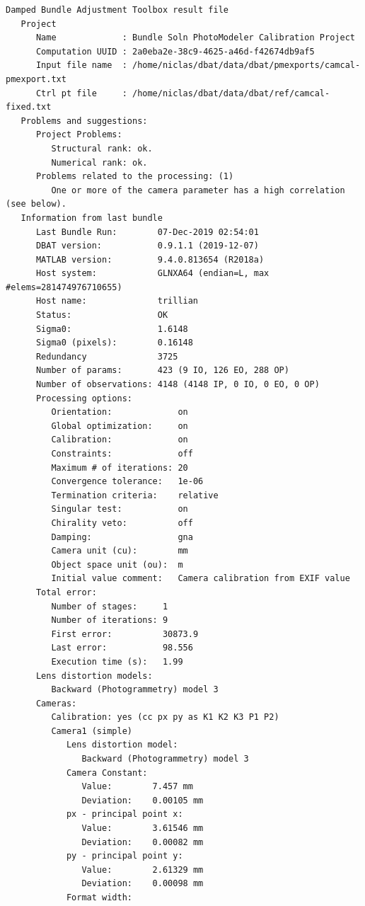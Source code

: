 \documentclass{article}
\begin{document}
\begin{verbatim}
Damped Bundle Adjustment Toolbox result file
   Project
      Name             : Bundle Soln PhotoModeler Calibration Project
      Computation UUID : 2a0eba2e-38c9-4625-a46d-f42674db9af5
      Input file name  : /home/niclas/dbat/data/dbat/pmexports/camcal-pmexport.txt
      Ctrl pt file     : /home/niclas/dbat/data/dbat/ref/camcal-fixed.txt
   Problems and suggestions:
      Project Problems:
         Structural rank: ok.
         Numerical rank: ok.
      Problems related to the processing: (1)
         One or more of the camera parameter has a high correlation (see below).
   Information from last bundle
      Last Bundle Run:        07-Dec-2019 02:54:01
      DBAT version:           0.9.1.1 (2019-12-07)
      MATLAB version:         9.4.0.813654 (R2018a)
      Host system:            GLNXA64 (endian=L, max #elems=281474976710655)
      Host name:              trillian
      Status:                 OK
      Sigma0:                 1.6148
      Sigma0 (pixels):        0.16148
      Redundancy              3725
      Number of params:       423 (9 IO, 126 EO, 288 OP)
      Number of observations: 4148 (4148 IP, 0 IO, 0 EO, 0 OP)
      Processing options:
         Orientation:             on
         Global optimization:     on
         Calibration:             on
         Constraints:             off
         Maximum # of iterations: 20
         Convergence tolerance:   1e-06
         Termination criteria:    relative
         Singular test:           on
         Chirality veto:          off
         Damping:                 gna
         Camera unit (cu):        mm
         Object space unit (ou):  m
         Initial value comment:   Camera calibration from EXIF value
      Total error:
         Number of stages:     1
         Number of iterations: 9
         First error:          30873.9
         Last error:           98.556
         Execution time (s):   1.99
      Lens distortion models:
         Backward (Photogrammetry) model 3
      Cameras:
         Calibration: yes (cc px py as K1 K2 K3 P1 P2)
         Camera1 (simple)
            Lens distortion model:
               Backward (Photogrammetry) model 3
            Camera Constant:
               Value:        7.457 mm
               Deviation:    0.00105 mm
            px - principal point x:
               Value:        3.61546 mm
               Deviation:    0.00082 mm
            py - principal point y:
               Value:        2.61329 mm
               Deviation:    0.00098 mm
            Format width:

\end{verbatim}
\end{document}
